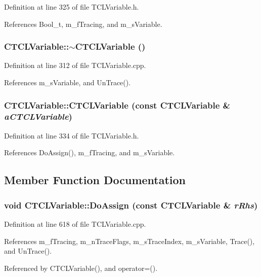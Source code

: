Definition at line 325 of file TCLVariable.h.

References Bool\_\-t, m\_\-f\-Tracing, and m\_\-s\-Variable.
\subsubsection{\setlength{\rightskip}{0pt plus 5cm}CTCLVariable::$\sim$CTCLVariable ()}\label{classCTCLVariable_a2}




Definition at line 312 of file TCLVariable.cpp.

References m\_\-s\-Variable, and Un\-Trace().
\subsubsection{\setlength{\rightskip}{0pt plus 5cm}CTCLVariable::CTCLVariable (const CTCLVariable \& {\em a\-CTCLVariable})\hspace{0.3cm}{\tt  [inline]}}\label{classCTCLVariable_a3}




Definition at line 334 of file TCLVariable.h.

References Do\-Assign(), m\_\-f\-Tracing, and m\_\-s\-Variable.

\subsection{Member Function Documentation}
\subsubsection{\setlength{\rightskip}{0pt plus 5cm}void CTCLVariable::Do\-Assign (const CTCLVariable \& {\em r\-Rhs})\hspace{0.3cm}{\tt  [protected]}}\label{classCTCLVariable_b1}




Definition at line 618 of file TCLVariable.cpp.

References m\_\-f\-Tracing, m\_\-n\-Trace\-Flags, m\_\-s\-Trace\-Index, m\_\-s\-Variable, Trace(), and Un\-Trace().

Referenced by CTCLVariable(), and operator=().
